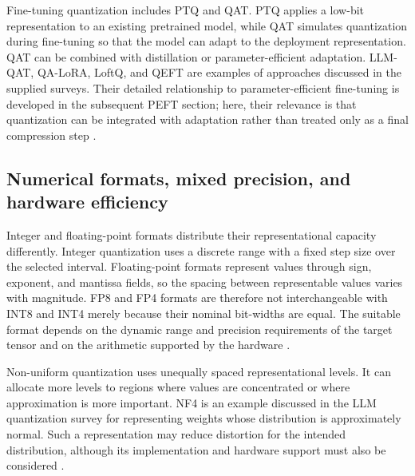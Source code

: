 Fine-tuning quantization includes PTQ and QAT. PTQ applies a low-bit
representation to an existing pretrained model, while QAT simulates
quantization during fine-tuning so that the model can adapt to the
deployment representation. QAT can be combined with distillation or
parameter-efficient adaptation. LLM-QAT, QA-LoRA, LoftQ, and QEFT
are examples of approaches discussed in the supplied surveys. Their
detailed relationship to parameter-efficient fine-tuning is developed
in the subsequent PEFT section; here, their relevance is that
quantization can be integrated with adaptation rather than treated
only as a final compression step
\parencite{song2026targetcentricqat,chen2026llmquantization}.

\subsection{Numerical formats, mixed precision, and hardware efficiency}
\label{subsec:quant-formats-hardware}

Integer and floating-point formats distribute their representational
capacity differently. Integer quantization uses a discrete range with
a fixed step size over the selected interval. Floating-point formats
represent values through sign, exponent, and mantissa fields, so the
spacing between representable values varies with magnitude. FP8 and
FP4 formats are therefore not interchangeable with INT8 and INT4
merely because their nominal bit-widths are equal. The suitable format
depends on the dynamic range and precision requirements of the target
tensor and on the arithmetic supported by the hardware
\parencite{chen2026llmquantization}.

Non-uniform quantization uses unequally spaced representational levels.
It can allocate more levels to regions where values are concentrated
or where approximation is more important. NF4 is an example discussed
in the LLM quantization survey for representing weights whose
distribution is approximately normal. Such a representation may
reduce distortion for the intended distribution, although its
implementation and hardware support must also be considered
\parencite{chen2026llmquantization}.

